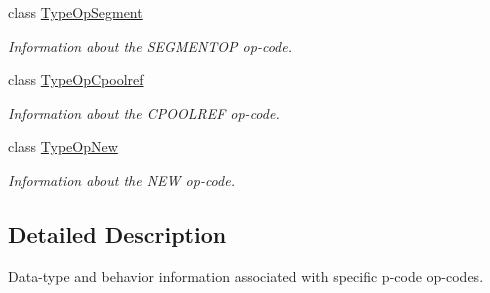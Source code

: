 \begin{DoxyCompactItemize}
class \mbox{\hyperlink{class_type_op_segment}{Type\+Op\+Segment}}
\begin{DoxyCompactList}\small\item\em Information about the S\+E\+G\+M\+E\+N\+T\+OP op-\/code. \end{DoxyCompactList}\item 
class \mbox{\hyperlink{class_type_op_cpoolref}{Type\+Op\+Cpoolref}}
\begin{DoxyCompactList}\small\item\em Information about the C\+P\+O\+O\+L\+R\+EF op-\/code. \end{DoxyCompactList}\item 
class \mbox{\hyperlink{class_type_op_new}{Type\+Op\+New}}
\begin{DoxyCompactList}\small\item\em Information about the N\+EW op-\/code. \end{DoxyCompactList}\end{DoxyCompactItemize}


\subsection{Detailed Description}
Data-\/type and behavior information associated with specific p-\/code op-\/codes. 


